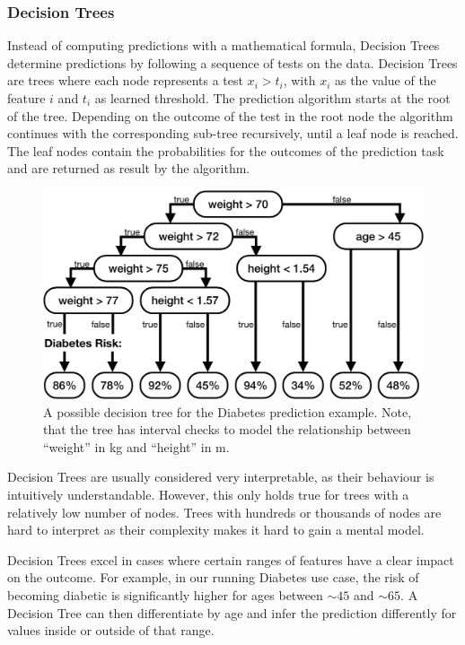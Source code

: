 \subsubsection{Decision Trees}
Instead of computing predictions with a mathematical formula, Decision Trees \cite{mlbook} determine predictions by following a sequence of tests on the data.
Decision Trees are trees where each node represents a test $x_i > t_i$, with $x_i$ as the value of the feature $i$ and $t_i$ as learned threshold.
The prediction algorithm starts at the root of the tree.
Depending on the outcome of the test in the root node the algorithm continues with the corresponding sub-tree recursively, until a leaf node is reached.
The leaf nodes contain the probabilities for the outcomes of the prediction task and are returned as result by the algorithm.

\begin{figure}
    \centering
    \includegraphics[width=0.9\linewidth]{tex/decisiontree}
    \caption[Example Decision Tree]{A possible decision tree for the Diabetes prediction example\footnotemark. Note, that the tree has interval checks to model the relationship between ``weight'' in \si{kg} and ``height'' in \si{m}.}
    \label{figs:dctree}
\end{figure}

Decision Trees are usually considered very interpretable, as their behaviour is intuitively understandable.
However, this only holds true for trees with a relatively low number of nodes.
Trees with hundreds or thousands of nodes are hard to interpret as their complexity makes it hard to gain a mental model.

Decision Trees excel in cases where certain ranges of features have a clear impact on the outcome.
For example, in our running Diabetes use case, the risk of becoming diabetic is significantly higher for ages between ${\sim}45$ and ${\sim}65$.
A Decision Tree can then differentiate by age and infer the prediction differently for values inside or outside of that range.

